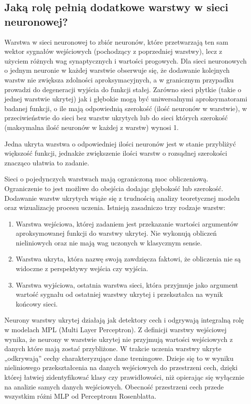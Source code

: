 \subsection{Jaką rolę pełnią dodatkowe warstwy w sieci neuronowej?}

Warstwa w sieci neuronowej to zbiór neuronów, które przetwarzają ten sam wektor sygnałów wejściowych (pochodzący z poprzedniej warstwy), lecz z użyciem różnych wag synaptycznych i wartości progowych. 
Dla sieci neuronowych o jednym neuronie w każdej warstwie obserwuje się, że dodawanie kolejnych warstw nie zwiększa zdolności aproksymacyjnych, a w granicznym przypadku prowadzi do degeneracji wyjścia do funkcji stałej.
Zarówno sieci płytkie (takie o jednej warstwie ukrytej) jak i głębokie mogą być uniwersalnymi aproksymatorami badanej funkcji, o ile mają odpowiednią szerokość (ilość neuronów w warstwie), w przeciwieństwie do sieci bez warstw ukrytych lub do sieci których szerokość (maksymalna ilość neuronów w każdej z warstw) wynosi 1.\cite{tutorial_nn_activation}

Jedna ukryta warstwa o odpowiedniej ilości neuronów jest w stanie przybliżyć większość funkcji, jednakże zwiększenie ilości warstw o rozsądnej szerokości znacząco ułatwia to zadanie. \cite{islp}

Sieci o pojedynczych warstwach mają ograniczoną moc obliczeniową. Ograniczenie to jest możliwe do obejścia dodając głębokość lub szerokość.
Dodawanie warstw ukrytych wiąże się z trudnością analizy teoretycznej modelu oraz wizualizację procesu uczenia.
Istnieją zasadniczo trzy rodzaje warstw:
\begin{enumerate}
    \item Warstwa wejściowa, której zadaniem jest przekazanie wartości argumentów aproksymowanej funkcji do warstwy ukrytej. Nie wykonują obliczeń nieliniowych oraz nie mają wag uczonych w klasycznym sensie.
    \item Warstwa ukryta, która nazwę swoją zawdzięcza faktowi, że obliczenia nie są widoczne z perspektywy wejścia czy wyjścia. 
    \item Warstwa wyjściowa, ostatnia warstwa sieci, która przyjmuje jako argument wartość sygnału od ostatniej warstwy ukrytej i przekształca na wynik końcowy sieci.
\end{enumerate}

Neurony warstwy ukrytej działają jak detektory cech i odgrywają integralną rolę w modelach MPL (Multi Layer Perceptron). Z definicji warstwy wejściowej wynika, że neurony w warstwie ukrytej nie przyjmują wartości wejściowych z danych które mają zostać przybliżone. W trakcie uczenia warstwy ukryte „odkrywają” cechy charakteryzujące dane treningowe. Dzieje się to w wyniku nieliniowego przekształcenia na danych wejściowych do przestrzeni cech, dzięki której łatwiej zidentyfikować klasy czy prawidłowości, niż opierając się wyłącznie na analizie samych danych wejściowych. Obecność przestrzeni cech przede wszystkim różni MLP od Perceptronu Rosenblatta.

